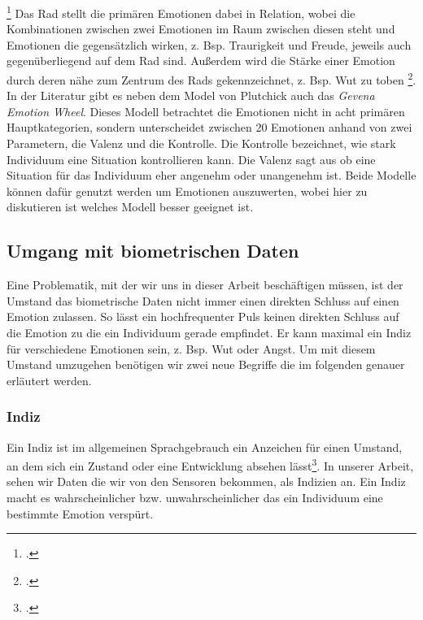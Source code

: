 \footcitetext[Vgl.][]{Hok17}
\newline
Das Rad stellt die primären Emotionen dabei in Relation, wobei die Kombinationen zwischen zwei Emotionen im Raum zwischen diesen steht und Emotionen die gegensätzlich wirken, z. Bsp. Traurigkeit und Freude, jeweils auch gegenüberliegend auf dem Rad sind. Außerdem wird die Stärke einer Emotion durch deren nähe zum Zentrum des Rads gekennzeichnet, z. Bsp. Wut zu toben \footcite[Vgl.][Absch. Elements of the Wheel]{Hok17}.\newline
In der Literatur gibt es neben dem Model von Plutchick auch das \textit{Gevena Emotion Wheel}. Dieses Modell betrachtet die Emotionen nicht in acht primären Hauptkategorien, sondern unterscheidet zwischen 20 Emotionen anhand von zwei Parametern, die Valenz und die Kontrolle. Die Kontrolle bezeichnet, wie stark Individuum eine Situation kontrollieren kann. Die Valenz sagt aus ob eine Situation für das Individuum eher angenehm oder unangenehm ist.\newline 
Beide Modelle können dafür genutzt werden um Emotionen auszuwerten, wobei hier zu diskutieren ist welches Modell besser geeignet ist.
\subsection{Umgang mit biometrischen Daten}
Eine Problematik, mit der wir uns in dieser Arbeit beschäftigen müssen, ist der Umstand das biometrische Daten nicht immer einen direkten Schluss auf einen Emotion zulassen. So lässt ein hochfrequenter Puls keinen direkten Schluss auf die Emotion zu die ein Individuum gerade empfindet. Er kann maximal ein Indiz für verschiedene Emotionen sein, z. Bsp. Wut oder Angst. Um mit diesem Umstand umzugehen benötigen wir zwei neue Begriffe die im folgenden genauer erläutert werden. 
\subsubsection{Indiz}
Ein Indiz ist im allgemeinen Sprachgebrauch ein Anzeichen für einen Umstand, an dem sich ein Zustand oder eine Entwicklung absehen lässt\footcite[Vgl.][]{Dud18}. In unserer Arbeit, sehen wir Daten die wir von den Sensoren bekommen, als Indizien an. Ein Indiz macht es wahrscheinlicher bzw. unwahrscheinlicher das ein Individuum eine bestimmte Emotion verspürt. 

